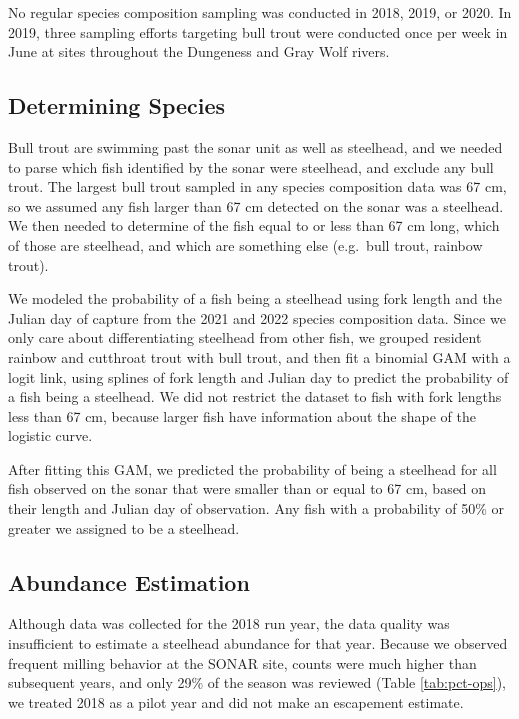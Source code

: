 \documentclass[
]{article}
\begin{document}
No regular species composition sampling was conducted in 2018, 2019, or 2020. In 2019, three sampling efforts targeting bull trout were conducted once per week in June at sites throughout the Dungeness and Gray Wolf rivers.

\hypertarget{determining-species}{%
\subsection{Determining Species}\label{determining-species}}

Bull trout are swimming past the sonar unit as well as steelhead, and we needed to parse which fish identified by the sonar were steelhead, and exclude any bull trout. The largest bull trout sampled in any species composition data was 67 cm, so we assumed any fish larger than 67 cm detected on the sonar was a steelhead. We then needed to determine of the fish equal to or less than 67 cm long, which of those are steelhead, and which are something else (e.g.~bull trout, rainbow trout).

We modeled the probability of a fish being a steelhead using fork length and the Julian day of capture from the 2021 and 2022 species composition data. Since we only care about differentiating steelhead from other fish, we grouped resident rainbow and cutthroat trout with bull trout, and then fit a binomial GAM with a logit link, using splines of fork length and Julian day to predict the probability of a fish being a steelhead. We did not restrict the dataset to fish with fork lengths less than 67 cm, because larger fish have information about the shape of the logistic curve.

After fitting this GAM, we predicted the probability of being a steelhead for all fish observed on the sonar that were smaller than or equal to 67 cm, based on their length and Julian day of observation. Any fish with a probability of 50\% or greater we assigned to be a steelhead.

\hypertarget{abundance-estimation}{%
\subsection{Abundance Estimation}\label{abundance-estimation}}

Although data was collected for the 2018 run year, the data quality was insufficient to estimate a steelhead abundance for that year. Because we observed frequent milling behavior at the SONAR site, counts were much higher than subsequent years, and only 29\% of the season was reviewed (Table \ref{tab:pct-ops}), we treated 2018 as a pilot year and did not make an escapement estimate.
\end{document}

